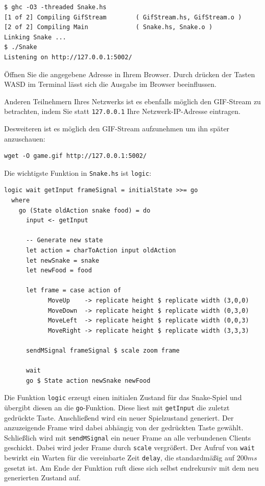 \documentclass{scrartcl}
\begin{document}
\begin{lstlisting}
$ ghc -O3 -threaded Snake.hs
[1 of 2] Compiling GifStream        ( GifStream.hs, GifStream.o )
[2 of 2] Compiling Main             ( Snake.hs, Snake.o )
Linking Snake ...
$ ./Snake
Listening on http://127.0.0.1:5002/
\end{lstlisting}

Öffnen Sie die angegebene Adresse in Ihrem Browser.
Durch drücken der Tasten WASD im Terminal lässt sich die Ausgabe im Browser beeinflussen.

Anderen Teilnehmern Ihres Netzwerks ist es ebenfalls möglich den GIF-Stream zu betrachten, indem Sie statt \texttt{127.0.0.1} Ihre Netzwerk-IP-Adresse eintragen.

Desweiteren ist es möglich den GIF-Stream aufzunehmen um ihn später anzuschauen:

\begin{lstlisting}
wget -O game.gif http://127.0.0.1:5002/
\end{lstlisting}

Die wichtigste Funktion in \texttt{Snake.hs} ist \texttt{logic}:

\begin{lstlisting}
logic wait getInput frameSignal = initialState >>= go
  where
    go (State oldAction snake food) = do
      input <- getInput

      -- Generate new state
      let action = charToAction input oldAction
      let newSnake = snake
      let newFood = food

      let frame = case action of
            MoveUp    -> replicate height $ replicate width (3,0,0)
            MoveDown  -> replicate height $ replicate width (0,3,0)
            MoveLeft  -> replicate height $ replicate width (0,0,3)
            MoveRight -> replicate height $ replicate width (3,3,3)

      sendMSignal frameSignal $ scale zoom frame

      wait
      go $ State action newSnake newFood
\end{lstlisting}

Die Funktion \texttt{logic} erzeugt einen initialen Zustand für das Snake-Spiel und übergibt diesen an die \texttt{go}-Funktion.
Diese liest mit \texttt{getInput} die zuletzt gedrückte Taste.
Anschließend wird ein neuer Spielzustand generiert.
Der anzuzeigende Frame wird dabei abhängig von der gedrückten Taste gewählt.
Schließlich wird mit \texttt{sendMSignal} ein neuer Frame an alle verbundenen Clients geschickt.
Dabei wird jeder Frame durch \texttt{scale} vergrößert.
Der Aufruf von \texttt{wait} bewirkt ein Warten für die vereinbarte Zeit \texttt{delay}, die standardmäßig auf $200 ms$ gesetzt ist.
Am Ende der Funktion ruft diese sich selbst endrekursiv mit dem neu generierten Zustand auf.
\end{document}
